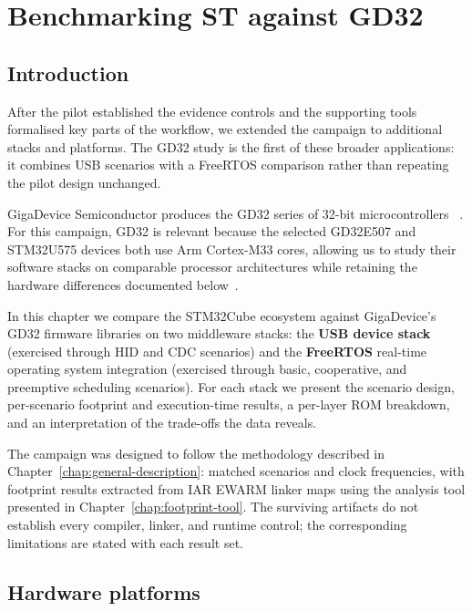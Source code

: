 \chapter{Benchmarking ST against GD32}
\label{chap:vs-gd32}

\section*{Introduction}

After the pilot established the evidence controls and the supporting tools formalised key
parts of the workflow, we extended the campaign to additional stacks and platforms. The
GD32 study is the first of these broader applications: it combines USB scenarios with a
FreeRTOS comparison rather than repeating the pilot design unchanged.

GigaDevice Semiconductor produces the GD32 series of 32-bit microcontrollers
~\cite{gigadevice-gd32}. For this campaign, GD32 is relevant because the selected
GD32E507 and STM32U575 devices both use Arm Cortex-M33 cores, allowing us to study their
software stacks on comparable processor architectures while retaining the hardware
differences documented below~\cite{gd32e507-ds,stm32u575-ds}.

In this chapter we compare the STM32Cube ecosystem against GigaDevice's GD32 firmware
libraries on two middleware stacks: the \textbf{USB device stack} (exercised through HID and
CDC scenarios) and the \textbf{FreeRTOS} real-time operating system integration (exercised
through basic, cooperative, and preemptive scheduling scenarios). For each stack we present
the scenario design, per-scenario footprint and execution-time results, a per-layer ROM
breakdown, and an interpretation of the trade-offs the data reveals.

The campaign was designed to follow the methodology described in
Chapter~\ref{chap:general-description}: matched scenarios and clock frequencies, with
footprint results extracted from IAR EWARM linker maps using the analysis tool presented in
Chapter~\ref{chap:footprint-tool}. The surviving artifacts do not establish every compiler,
linker, and runtime control; the corresponding limitations are stated with each result set.

\section{Hardware platforms}
\label{sec:gd32-boards}

